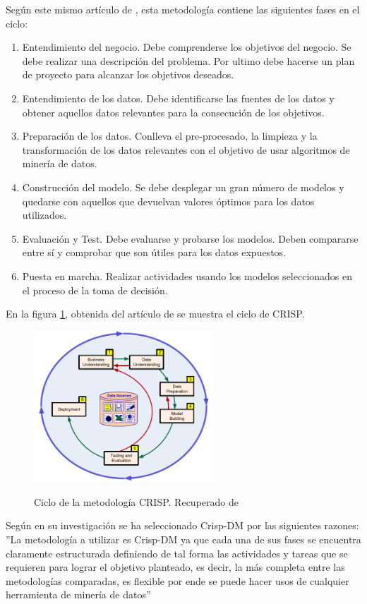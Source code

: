 Según este mismo artículo de , esta metodología contiene las siguientes fases en el ciclo:
\begin{enumerate}
	\item Entendimiento del negocio. Debe comprenderse los objetivos del negocio. Se debe realizar una descripción del problema. Por ultimo debe hacerse un plan de proyecto para alcanzar los objetivos deseados.
	\item Entendimiento de los datos. Debe identificarse las fuentes de los datos y obtener aquellos datos relevantes para la consecución de los objetivos.
	\item Preparación de los datos. Conlleva el pre-procesado, la limpieza y la transformación de los datos relevantes con el objetivo de usar algoritmos de minería de datos.
	\item Construcción del modelo. Se debe desplegar un gran número de modelos y quedarse con aquellos que devuelvan valores óptimos para los datos utilizados.
	\item Evaluación y Test. Debe evaluarse y probarse los modelos. Deben compararse entre sí y comprobar que son útiles para los datos expuestos.
	\item Puesta en marcha. Realizar actividades usando los modelos seleccionados en el proceso de la toma de decisión.
\end{enumerate}

En la figura \ref{fig:cicloCrisp}, obtenida del artículo de  se muestra el ciclo de CRISP.

\begin{figure}[htb]
	\centering
	\caption{Ciclo de la metodología CRISP. Recuperado de \protect{}}
	\includegraphics[width=0.6\textwidth]{recursos/CRISPCiclo}
	\label{fig:cicloCrisp}
\end{figure}

Según \cite{jaramillo2015aplicacion} en su investigación se ha seleccionado Crisp-DM por las siguientes razones: ''La metodología a utilizar es Crisp-DM ya que cada una de sus fases se encuentra claramente estructurada definiendo de tal forma las actividades y tareas que se requieren para lograr el objetivo planteado, es decir, la más completa entre las metodologías comparadas, es flexible por ende se puede hacer usos de cualquier herramienta de minería de datos''

